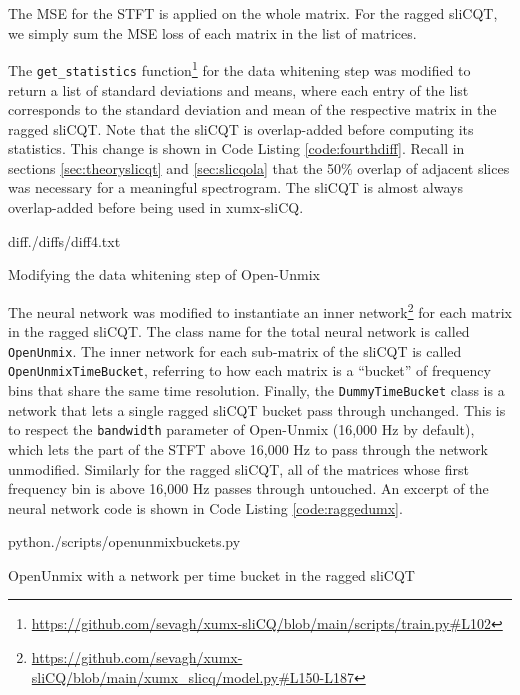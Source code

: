 \documentclass[report.tex]{subfiles}
\begin{document}
The MSE for the STFT is applied on the whole matrix. For the ragged sliCQT, we simply sum the MSE loss of each matrix in the list of matrices.

The \Verb#get_statistics# function\footnote{\url{https://github.com/sevagh/xumx-sliCQ/blob/main/scripts/train.py\#L102}} for the data whitening step was modified to return a list of standard deviations and means, where each entry of the list corresponds to the standard deviation and mean of the respective matrix in the ragged sliCQT. Note that the sliCQT is overlap-added before computing its statistics. This change is shown in Code Listing \ref{code:fourthdiff}. Recall in sections \ref{sec:theoryslicqt} and \ref{sec:slicqola} that the 50\% overlap of adjacent slices was necessary for a meaningful spectrogram. The sliCQT is almost always overlap-added before being used in xumx-sliCQ.

\begin{listing}[ht]
  \centering
\begin{inputminted}[linenos,breaklines,frame=single,fontsize=\scriptsize]{diff}{./diffs/diff4.txt}
\end{inputminted}
  \caption{Modifying the data whitening step of Open-Unmix}
  \label{code:fourthdiff}
\end{listing}

The neural network was modified to instantiate an inner network\footnote{\url{https://github.com/sevagh/xumx-sliCQ/blob/main/xumx_slicq/model.py\#L150-L187}} for each matrix in the ragged sliCQT. The class name for the total neural network is called \Verb#OpenUnmix#. The inner network for each sub-matrix of the sliCQT is called \Verb#OpenUnmixTimeBucket#, referring to how each matrix is a ``bucket'' of frequency bins that share the same time resolution. Finally, the \Verb#DummyTimeBucket# class is a network that lets a single ragged sliCQT bucket pass through unchanged. This is to respect the \Verb#bandwidth# parameter of Open-Unmix (16,000 Hz by default), which lets the part of the STFT above 16,000 Hz to pass through the network unmodified. Similarly for the ragged sliCQT, all of the matrices whose first frequency bin is above 16,000 Hz passes through untouched. An excerpt of the neural network code is shown in Code Listing \ref{code:raggedumx}.

\begin{listing}[ht]
  \centering
\begin{inputminted}[linenos,breaklines,frame=single,fontsize=\scriptsize]{python}{./scripts/openunmixbuckets.py}
\end{inputminted}
  \caption{OpenUnmix with a network per time bucket in the ragged sliCQT}
  \label{code:raggedumx}
\end{listing}
\end{document}
